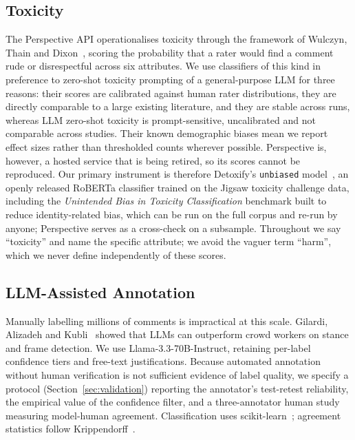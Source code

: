 \documentclass[10pt,twocolumn]{article}
\begin{document}
\subsection{Toxicity}
The Perspective API operationalises toxicity through the framework of Wulczyn,
Thain and Dixon~\cite{wulczyn2017}, scoring the probability that a rater would find a
comment rude or disrespectful across six attributes. We use classifiers of this
kind in preference to zero-shot toxicity prompting of a general-purpose LLM for three
reasons: their scores are calibrated against human rater distributions, they are
directly comparable to a large existing literature, and they are stable across runs,
whereas LLM zero-shot toxicity is prompt-sensitive, uncalibrated and not comparable
across studies. Their known demographic biases mean we report effect sizes rather than
thresholded counts wherever possible. Perspective is, however, a hosted service that
is being retired, so its scores cannot be reproduced. Our primary instrument is
therefore Detoxify's \texttt{unbiased} model~\cite{detoxify2020}, an openly
released RoBERTa classifier trained on the Jigsaw toxicity challenge data,
including the \emph{Unintended Bias in Toxicity Classification} benchmark built to
reduce identity-related bias, which can be run on the full corpus and re-run by
anyone; Perspective serves as a cross-check
on a subsample. Throughout we say ``toxicity'' and name the specific attribute; we
avoid the vaguer term ``harm'', which we never define independently of these
scores.

\subsection{LLM-Assisted Annotation}
Manually labelling millions of comments is impractical at this scale. Gilardi,
Alizadeh and Kubli~\cite{gilardi2023} showed that LLMs can outperform crowd workers
on stance and frame detection. We use Llama-3.3-70B-Instruct, retaining per-label
confidence tiers and free-text justifications. Because automated annotation without
human verification is not sufficient evidence of label quality, we specify a
protocol (Section~\ref{sec:validation}) reporting the annotator's test-retest reliability, the empirical value of the confidence filter, and a three-annotator human study measuring
model-human agreement.
Classification uses scikit-learn~\cite{pedregosa2011}; agreement statistics follow
Krippendorff~\cite{hayes2007}.

\end{document}
